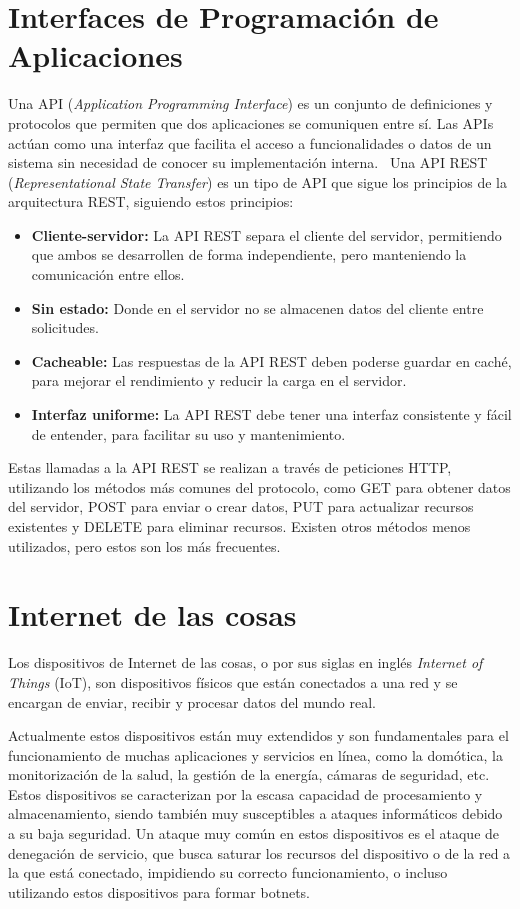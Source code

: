 \section{Interfaces de Programación de Aplicaciones}
Una API (\textit{Application Programming Interface}) es un conjunto de definiciones y protocolos que permiten que dos aplicaciones se comuniquen entre sí. Las APIs actúan como una interfaz que facilita el acceso a funcionalidades o datos de un sistema sin necesidad de conocer su implementación interna.~\cite{Api}
Una API REST (\textit{Representational State Transfer}) es un tipo de API que sigue los principios de la arquitectura REST, siguiendo estos principios:
\begin{itemize}
	\item \textbf{Cliente-servidor:} La API REST separa el cliente del servidor, permitiendo que ambos se desarrollen de forma independiente, pero manteniendo la comunicación entre ellos.
	\item \textbf{Sin estado:} Donde en el servidor no se almacenen datos del cliente entre solicitudes.
	\item \textbf{Cacheable:} Las respuestas de la API REST deben poderse guardar en caché, para mejorar el rendimiento y reducir la carga en el servidor.
	\item \textbf{Interfaz uniforme:} La API REST debe tener una interfaz consistente y fácil de entender, para facilitar su uso y mantenimiento.
\end{itemize}
Estas llamadas a la API REST se realizan a través de peticiones HTTP, utilizando los métodos más comunes del protocolo, como GET para obtener datos del servidor, POST para enviar o crear datos, PUT para actualizar recursos existentes y DELETE para eliminar recursos. Existen otros métodos menos utilizados, pero estos son los más frecuentes.

\section{Internet de las cosas}
Los dispositivos de Internet de las cosas, o por sus siglas en inglés \textit{Internet of Things} (IoT), son dispositivos físicos que están conectados a una red y se encargan de enviar, recibir y procesar datos del mundo real. ~\cite{AzizAlKabir2023} 

Actualmente estos dispositivos están muy extendidos y son fundamentales para el funcionamiento de muchas aplicaciones y servicios en línea, como la domótica, la monitorización de la salud, la gestión de la energía, cámaras de seguridad, etc. Estos dispositivos se caracterizan por la escasa capacidad de procesamiento y almacenamiento, siendo también muy susceptibles a ataques informáticos debido a su baja seguridad. Un ataque muy común en estos dispositivos es el ataque de denegación de servicio, que busca saturar los recursos del dispositivo o de la red a la que está conectado, impidiendo su correcto funcionamiento, o incluso utilizando estos dispositivos para formar botnets. ~\cite{kolias2017}


